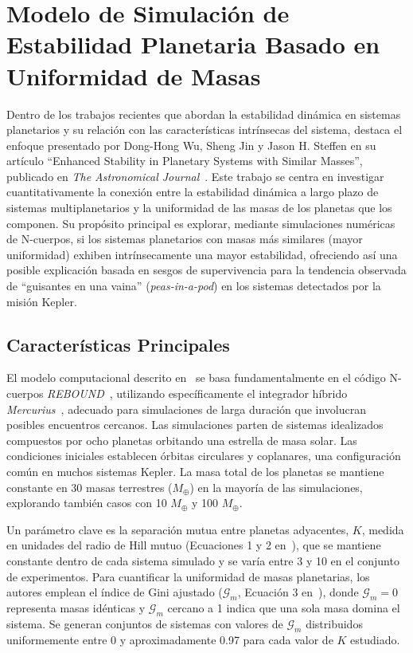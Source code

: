 
\section[Modelo de Estabilidad Planetaria]{Modelo de Simulación de Estabilidad Planetaria Basado en Uniformidad de Masas}%
\label{sec:wu_model}

Dentro de los trabajos recientes que abordan la estabilidad dinámica en sistemas planetarios y su relación con las características intrínsecas del sistema, destaca el enfoque presentado por Dong-Hong Wu, Sheng Jin y Jason H. Steffen en su artículo ``Enhanced Stability in Planetary Systems with Similar Masses'', publicado en \textit{The Astronomical Journal}~\cite{Wu2025}. Este trabajo se centra en investigar cuantitativamente la conexión entre la estabilidad dinámica a largo plazo de sistemas multiplanetarios y la uniformidad de las masas de los planetas que los componen. Su propósito principal es explorar, mediante simulaciones numéricas de N-cuerpos, si los sistemas planetarios con masas más similares (mayor uniformidad) exhiben intrínsecamente una mayor estabilidad, ofreciendo así una posible explicación basada en sesgos de supervivencia para la tendencia observada de ``guisantes en una vaina'' (\textit{peas-in-a-pod}) en los sistemas detectados por la misión Kepler.

\subsection{Características Principales}
El modelo computacional descrito en~\cite{Wu2025} se basa fundamentalmente en el código N-cuerpos \textit{REBOUND}~\cite{Rein2012}, utilizando específicamente el integrador híbrido \textit{Mercurius}~\cite{rein2019}, adecuado para simulaciones de larga duración que involucran posibles encuentros cercanos. Las simulaciones parten de sistemas idealizados compuestos por ocho planetas orbitando una estrella de masa solar. Las condiciones iniciales establecen órbitas circulares y coplanares, una configuración común en muchos sistemas Kepler. La masa total de los planetas se mantiene constante en 30 masas terrestres ($M_\oplus$) en la mayoría de las simulaciones, explorando también casos con 10 $M_\oplus$ y 100 $M_\oplus$.

Un parámetro clave es la separación mutua entre planetas adyacentes, $K$, medida en unidades del radio de Hill mutuo (Ecuaciones 1 y 2 en~\cite{Wu2025}), que se mantiene constante dentro de cada sistema simulado y se varía entre 3 y 10 en el conjunto de experimentos. Para cuantificar la uniformidad de masas planetarias, los autores emplean el índice de Gini ajustado ($\mathcal{G}_m$, Ecuación 3 en~\cite{Wu2025}), donde $\mathcal{G}_m = 0$ representa masas idénticas y $\mathcal{G}_m$ cercano a 1 indica que una sola masa domina el sistema. Se generan conjuntos de sistemas con valores de $\mathcal{G}_m$ distribuidos uniformemente entre 0 y aproximadamente 0.97 para cada valor de $K$ estudiado.

